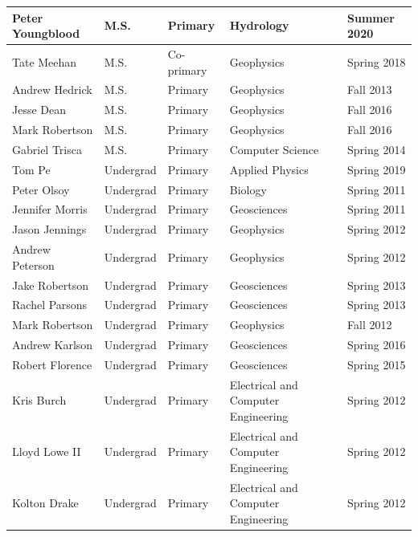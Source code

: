 \documentclass[11pt]{article}
\begin{document}
\begin{table}[!htbp]
\begin{tabular}{|l|l|l|l|l|}
Peter Youngblood & M.S. & Primary & Hydrology & Summer 2020 \\ \hline
Tate Meehan & M.S. & Co-primary & Geophysics & Spring 2018 \\ \hline
Andrew Hedrick & M.S. & Primary & Geophysics & Fall 2013 \\ \hline
Jesse Dean & M.S. & Primary & Geophysics & Fall 2016 \\ \hline
Mark Robertson & M.S. & Primary & Geophysics & Fall 2016 \\ \hline
Gabriel Trisca & M.S. & Primary & Computer Science & Spring 2014 \\ \hline
Tom Pe & Undergrad & Primary & Applied Physics & Spring 2019 \\ \hline
Peter Olsoy & Undergrad & Primary & Biology & Spring 2011 \\ \hline
Jennifer Morris & Undergrad & Primary & Geosciences & Spring 2011 \\ \hline
Jason Jennings & Undergrad & Primary & Geophysics & Spring 2012 \\ \hline
Andrew Peterson & Undergrad & Primary & Geophysics & Spring 2012 \\ \hline
Jake Robertson & Undergrad & Primary & Geosciences & Spring 2013 \\ \hline
Rachel Parsons & Undergrad & Primary & Geosciences & Spring 2013 \\ \hline
Mark Robertson & Undergrad & Primary & Geophysics & Fall 2012 \\ \hline
Andrew Karlson & Undergrad & Primary & Geosciences & Spring 2016 \\ \hline
Robert Florence & Undergrad & Primary & Geosciences & Spring 2015 \\ \hline
Kris Burch & Undergrad & Primary & Electrical and Computer Engineering & Spring 2012 \\ \hline
Lloyd Lowe II & Undergrad & Primary & Electrical and Computer Engineering & Spring 2012 \\ \hline
Kolton Drake & Undergrad & Primary & Electrical and Computer Engineering & Spring 2012 \\ \hline
\end{tabular}
\end{table}
\end{document}
